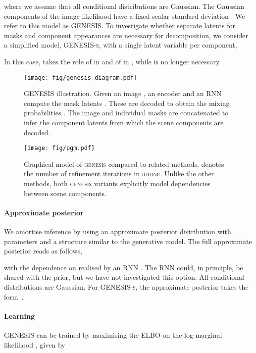 \documentclass{article}
\begin{document}
where we assume that all conditional distributions are Gaussian.
The Gaussian components of the image likelihood have a fixed scalar standard deviation .
We refer to this model as \gls{GENESIS}.
To investigate whether separate latents for masks and component appearances are necessary for decomposition, we consider a simplified model, \gls{GENESIS}\textsc{-s}, with a single latent variable per component,

In this case,  takes the role of  in  and of  in , while  is no longer necessary.

\begin{figure}[t!]
    \centering
    \texttt{[image: fig/genesis\_diagram.pdf]}
    \caption{\gls{GENESIS} illustration. Given an image , an encoder and an \gls{RNN} compute the mask latents . These are decoded to obtain the mixing probabilities . The image and individual masks are concatenated to infer the component latents  from which the scene components  are decoded.
    }
    \label{fig:arch}
\end{figure}

\begin{figure}
	\centering
	\texttt{[image: fig/pgm.pdf]}
    \caption{Graphical model of \textsc{genesis} compared to related methods.  denotes the number of refinement iterations in \textsc{iodine}. Unlike the other methods, both \textsc{genesis} variants explicitly model dependencies between scene components.}
\label{fig:pgms}
\end{figure}

\paragraph{Approximate posterior}
We amortise inference by using an approximate posterior distribution with parameters  and a structure similar to the generative model. 
The full approximate posterior reads as follows,

with the dependence on  realised by an \gls{RNN} . The \gls{RNN} could, in principle, be shared with the prior, but we have not investigated this option. All conditional distributions are Gaussian.
For \gls{GENESIS}\textsc{-s}, the approximate posterior takes the form \,.

\paragraph{Learning}
\Gls{GENESIS} can be trained by maximising the \gls{ELBO} on the log-marginal likelihood , given by
\end{document}

